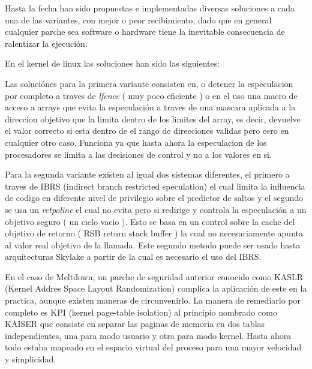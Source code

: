 \documentclass[paper=a4, fontsize=11pt]{scrartcl} %
\begin{document}
Hasta la fecha han sido propuestas e implementadas diversas soluciones a cada una de las variantes, con mejor o peor recibimiento, dado que en general cualquier parche sea software o hardware tiene la inevitable consecuencia de ralentizar la ejecución. 

En el kernel de linux las soluciones han sido las siguientes:

Las soluciónes para la primera variante consisten en, o detener la especulacion por completo a traves de \textit{lfence} ( muy poco eficiente ) o en el uso una macro de acceso a arrays que evita la especulación a traves de una mascara aplicada a la direccion objetivo que la limita dentro de los limites del array, es decir,  devuelve el valor correcto si esta dentro de el rango de direcciones validas pero cero en cualquier otro caso. Funciona ya que hasta ahora la especulacion de los procesadores se limita a las decisiones de control y no a los valores en si.

Para la segunda variante existen al igual dos sistemas diferentes, el primero a traves de IBRS (indirect branch restricted speculation) el cual limita la influencia de codigo en diferente nivel de privilegio sobre el predictor de saltos y el segundo se usa un \textit{retpoline} \cite{retpoline} el cual  no evita pero si redirige y controla la especulación a un objetivo seguro ( un ciclo vacio ). Esto se basa en un control sobre la cache del objetivo de retorno ( RSB return stack buffer ) la cual no necesariamente apunta al valor real objetivo de la llamada.
Este segundo metodo puede ser usado hasta arquitecturas Skylake a partir de la cual es necesario el uso del IBRS.


En el caso de Meltdown, un parche de seguridad anterior conocido como KASLR (Kernel Addres Space Layout Randomization) complica la aplicación de este en la practica, aunque existen maneras de circunvenirlo. La manera de remediarlo por completo es KPI (kernel page-table isolation) al principio nombrado como KAISER que consiste en separar las paginas de memoria en dos tablas independientes, una para modo usuario y otra para modo kernel. Hasta ahora todo estaba mapeado en el espacio virtual del proceso para una mayor velocidad y simplicidad.
\end{document}
